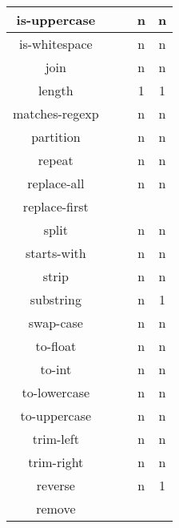\documentclass[anonymous,sigplan,review,11pt,nonacm,natbib=false]{acmart}
\begin{document}
\begin{table*}[]
\begin{tabular}{|c||c|c|c|c|}
        is-uppercase &  &  & n & n \\ \hline

        is-whitespace &  &  & n & n \\ \hline

        join &  &  & n & n \\ \hline

        length &  &  & 1 & 1 \\ \hline

        matches-regexp &  &  & n & n \\ \hline

        partition &  &  & n & n \\ \hline

        repeat &  &  & n & n \\ \hline

        replace-all &  &  & n & n \\ \hline

        replace-first  &  &  &  & \\ \hline

        split &  &  & n & n \\ \hline

        starts-with &  &  & n & n \\ \hline

        strip &  &  & n & n \\ \hline

        substring &  &  & n & 1 \\ \hline

        swap-case &  &  & n & n \\ \hline

        to-float &  &  & n & n \\ \hline

        to-int &  &  & n & n \\ \hline

        to-lowercase &  &  & n & n \\ \hline

        to-uppercase &  &  & n & n \\ \hline

        trim-left &  &  & n & n \\ \hline

        trim-right &  &  & n & n \\ \hline

        reverse &  &  & n & 1 \\ \hline

        remove &  &  &  & \\ \hline


\end{tabular}
\end{table*}
\end{document}
